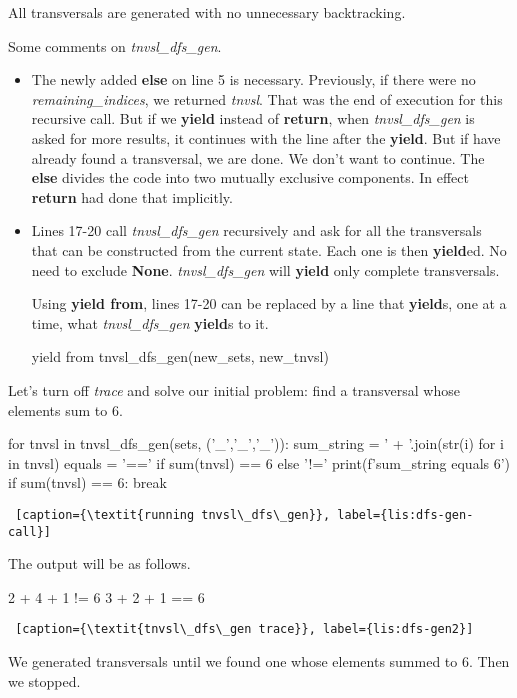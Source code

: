 All transversals are generated with no unnecessary backtracking.

Some comments on \textit{tnvsl\_dfs\_gen}.
\begin{itemize}
    \item The newly added \textbf{else} on line 5 is necessary. Previously, if there were no \textit{remaining\_indices}, we returned \textit{tnvsl}. That was the end of execution for this recursive call. But if we \textbf{yield} instead of \textbf{return}, when \textit{tnvsl\_dfs\_gen} is asked for more results, it continues with the line after the \textbf{yield}. But if have already found a transversal, we are done. We don't want to continue. The \textbf{else} divides the code into two mutually exclusive components. In effect \textbf{return} had done that implicitly.
    
    \item Lines 17-20 call \textit{tnvsl\_dfs\_gen} recursively and ask for all the transversals that can be constructed from the current state. Each one is then \textbf{yield}ed. No need to exclude \textbf{None}.  \textit{tnvsl\_dfs\_gen} will \textbf{yield} only complete transversals. 
    
    \smallv
Using \textbf{yield from}, lines 17-20 can be replaced by a line that \textbf{yield}s, one at a time, what \textit{tnvsl\_dfs\_gen} \textbf{yield}s to it.
\begin{python1}
yield from tnvsl_dfs_gen(new_sets, new_tnvsl)
\end{python1}
    
     
    
\end{itemize}

Let's turn off \textit{trace} and solve our initial problem: find a transversal whose elements sum to 6.

\begin{minipage}[c]{0.45\textwidth}
\begin{python1}
for tnvsl in tnvsl_dfs_gen(sets, ('_','_','_')):
  sum_string = ' + '.join(str(i) for i in tnvsl)
  equals = '==' if sum(tnvsl) == 6 else '!='
  print(f'{sum_string} {equals} 6')
  if sum(tnvsl) == 6: break
\end{python1}
\begin{lstlisting} [caption={\textit{running tnvsl\_dfs\_gen}}, label={lis:dfs-gen-call}]
\end{lstlisting}
\end{minipage}

The output will be as follows.

\begin{minipage}[c]{0.45\textwidth}
\begin{python1}[numbers=left]
2 + 4 + 1 != 6
3 + 2 + 1 == 6
\end{python1}
\begin{lstlisting} [caption={\textit{tnvsl\_dfs\_gen trace}}, label={lis:dfs-gen2}]
\end{lstlisting}
\end{minipage}

We generated transversals until we found one whose elements summed to 6. Then we stopped.
